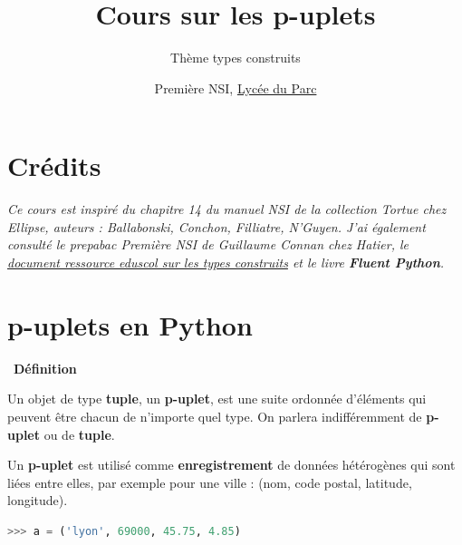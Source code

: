 \documentclass[
  11pt,
]{article}
\title{Cours sur les p-uplets}
\subtitle{Thème types construits}
\author{Première NSI, \href{https://frederic-junier.org/}{Lycée du
Parc}}
\date{}
\newcounter{def}
\newenvironment{definition}[1]
{\par \medskip   \addtocounter{def}{1} \noindent  
\begin{bclogo}[arrondi =0.1,  ombre = true, barre=none, logo=\bcbook, marge=4]{~\textbf{Définition} \textbf{\thedef} {\itshape #1} }  \par}
{
\end{bclogo}
 \par \bigskip }
\newcounter{cours}
\begin{document}
\maketitle

\renewcommand*\contentsname{Table des matières}
{
\hypersetup{linkcolor=}
\setcounter{tocdepth}{3}
\tableofcontents
}
\hypertarget{cruxe9dits}{%
\section*{Crédits}\label{cruxe9dits}}

\emph{Ce cours est inspiré du chapitre 14 du manuel NSI de la collection
Tortue chez Ellipse, auteurs : Ballabonski, Conchon, Filliatre, N'Guyen.
J'ai également consulté le prepabac Première NSI de Guillaume Connan
chez Hatier, le
\href{https://cache.media.eduscol.education.fr/file/NSI/77/7/RA_Lycee_G_NSI_repd_types_construits_1170777.pdf}{document
ressource eduscol sur les types construits} et le livre \textbf{Fluent
Python}.}

\hypertarget{p-uplets-en-python}{%
\section{p-uplets en Python}\label{p-uplets-en-python}}

\begin{definition}{}

Un objet de type \textbf{tuple}, un \textbf{p-uplet}, est une suite
ordonnée d'éléments qui peuvent être chacun de n'importe quel type. On
parlera indifféremment de \textbf{p-uplet} ou de \textbf{tuple}.

Un \textbf{p-uplet} est utilisé comme \textbf{enregistrement} de données
hétérogènes qui sont liées entre elles, par exemple pour une ville :
(nom, code postal, latitude, longitude).

\begin{lstlisting}[language=Python]
>>> a = ('lyon', 69000, 45.75, 4.85)
\end{lstlisting}

\end{definition}
\end{document}
